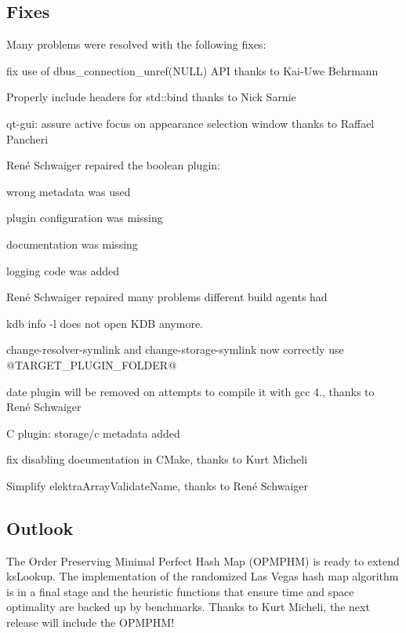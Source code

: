 \subsection*{Fixes}

Many problems were resolved with the following fixes\+:


\begin{DoxyItemize}
\item fix use of {\ttfamily dbus\+\_\+connection\+\_\+unref(\+N\+U\+L\+L)} A\+PI thanks to Kai-\/\+Uwe Behrmann
\item Properly include headers for {\ttfamily std\+::bind} thanks to Nick Sarnie
\item qt-\/gui\+: assure active focus on appearance selection window thanks to Raffael Pancheri
\item René Schwaiger repaired the {\ttfamily boolean} plugin\+:
\begin{DoxyItemize}
\item wrong metadata was used
\item plugin configuration was missing
\item documentation was missing
\item logging code was added
\end{DoxyItemize}
\item René Schwaiger repaired many problems different build agents had
\item {\ttfamily kdb info -\/l} does not open {\ttfamily K\+DB} anymore.
\item {\ttfamily change-\/resolver-\/symlink} and {\ttfamily change-\/storage-\/symlink} now correctly use {\ttfamily @T\+A\+R\+G\+E\+T\+\_\+\+P\+L\+U\+G\+I\+N\+\_\+\+F\+O\+L\+D\+ER@}
\item date plugin will be removed on attempts to compile it with gcc 4., thanks to René Schwaiger
\item C plugin\+: storage/c metadata added
\item fix disabling documentation in C\+Make, thanks to Kurt Micheli
\item Simplify {\ttfamily elektra\+Array\+Validate\+Name}, thanks to René Schwaiger
\end{DoxyItemize}

\subsection*{Outlook}

The Order Preserving Minimal Perfect Hash Map (O\+P\+M\+P\+HM) is ready to extend {\ttfamily ks\+Lookup}. The implementation of the randomized Las Vegas hash map algorithm is in a final stage and the heuristic functions that ensure time and space optimality are backed up by benchmarks. Thanks to Kurt Micheli, the next release will include the O\+P\+M\+P\+H\+M!

